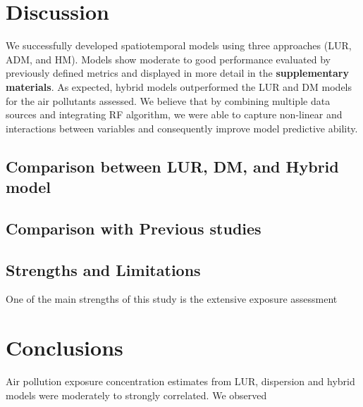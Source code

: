 \documentclass{article}
\begin{document}
\newpage

\section{Discussion}
We successfully developed spatiotemporal models using three approaches (LUR, ADM, and HM). Models show moderate to good performance 
evaluated by previously defined metrics and displayed in more detail in the \textbf{supplementary materials}. As expected, hybrid models outperformed the LUR and DM models for the air pollutants assessed. We believe that by combining multiple data sources and integrating RF algorithm, we were able to capture non-linear and interactions between variables and consequently improve model predictive ability. 


\subsection{Comparison between LUR, DM, and Hybrid model}






\subsection{Comparison with Previous studies}




\subsection{Strengths and Limitations}
One of the main strengths of this study is the extensive exposure assessment 

\section{Conclusions}

Air pollution exposure concentration estimates from LUR, dispersion and hybrid models were moderately to strongly correlated. We observed 



































\newpage


\end{document}
